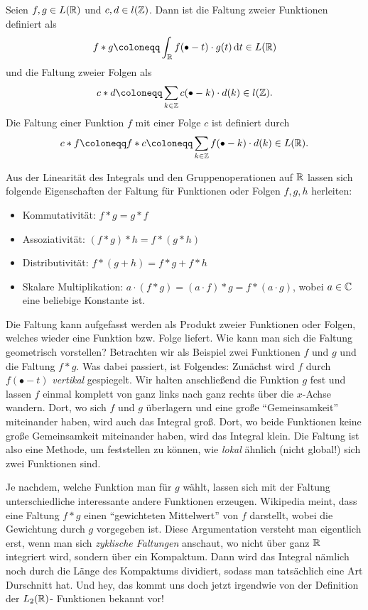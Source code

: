 \begin{definition}[Faltung]
Seien $ f, g \in L(\mathbb{R}) $ und $ c,d \in l(\mathbb{Z}) $. Dann ist die Faltung zweier Funktionen definiert als
\[
  f * g \coloneqq \int_{\R} f(\bullet - t) \cdot g(t) \dif t \in L(\R)
\]
und die Faltung zweier Folgen als
\[
  c * d \coloneqq \sum_{k \in \Z} c(\bullet - k) \cdot d(k) \in l(\Z).
\]
Die Faltung einer Funktion $ f $ mit einer Folge $ c $ ist definiert durch
\[
  c * f \coloneqq f * c \coloneqq \sum_{k \in \Z} f(\bullet - k) \cdot d(k) \in L(\R).
\]
\end{definition}

\begin{remark}
Aus der Linearität des Integrals und den Gruppenoperationen auf $ \mathbb{R} $ lassen sich folgende 
Eigenschaften der Faltung für Funktionen oder Folgen $ f, g, h $ herleiten:
\begin{itemize}
\item Kommutativität: $ f * g = g * f $
\item Assoziativität: $ (f * g) * h = f * (g * h) $
\item Distributivität: $ f * (g + h) = f * g + f * h $
\item Skalare Multiplikation: $ a \cdot (f * g) = (a \cdot f) * g = f * (a \cdot g) $, wobei
  $ a \in \mathbb{C} $ eine beliebige Konstante ist.
\end{itemize}
\end{remark}
\begin{remark}
Die Faltung kann aufgefasst werden als Produkt zweier Funktionen oder Folgen, welches wieder eine
Funktion bzw. Folge liefert. Wie kann man sich die Faltung geometrisch vorstellen? Betrachten wir 
als Beispiel zwei Funktionen $ f $ und $ g $ und die Faltung $ f * g $. Was dabei passiert, ist 
Folgendes: Zunächst wird $ f $ durch $ f(\bullet - t) $ \emph{vertikal} gespiegelt. Wir halten 
anschließend die Funktion $ g $ fest und lassen $ f $ einmal komplett von ganz links nach 
ganz rechts über die $ x $-Achse wandern. Dort, wo sich $ f $ und $ g $ überlagern und eine große 
\enquote{Gemeinsamkeit} miteinander haben, wird auch das Integral groß. Dort, wo beide Funktionen 
keine große Gemeinsamkeit miteinander haben, wird das Integral klein. Die Faltung ist also eine 
Methode, um feststellen zu können, wie \emph{lokal} ähnlich (nicht global!) sich zwei Funktionen 
sind.

Je nachdem, welche Funktion man für $ g $ wählt, lassen sich mit der Faltung unterschiedliche 
interessante andere Funktionen erzeugen. Wikipedia meint, dass eine Faltung $ f * g $ einen
\enquote{gewichteten Mittelwert} von $ f $ darstellt, wobei die Gewichtung durch $ g $ vorgegeben 
ist. Diese Argumentation versteht man eigentlich erst, wenn man sich \emph{zyklische Faltungen}
anschaut, wo nicht über ganz $ \mathbb{R} $ integriert wird, sondern über ein Kompaktum. Dann wird das
Integral nämlich noch durch die Länge des Kompaktums dividiert, sodass man tatsächlich eine Art
Durschnitt hat. Und hey, das kommt uns doch jetzt irgendwie von der Definition der $ L_{2}(\mathbb{R}) $-
Funktionen bekannt vor!
\end{remark}

